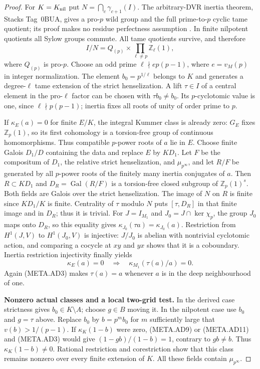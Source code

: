 \begin{proof}
For $K=K_{\rm nil}$ put $N=\bigcap_c\gamma_{c+1}(I)$.
The arbitrary-DVR inertia theorem, Stacks Tag~0BUA,
gives a pro-$p$ wild group and the full prime-to-$p$
cyclic tame quotient; its proof makes no residue
perfectness assumption \citep{AN_Stacks0BUA}.
In finite nilpotent quotients all Sylow groups commute.
All tame quotients survive, and therefore
\[
              I/N=Q_{(p)}\times
                         \prod_{\ell\ne p}\mathbb Z_\ell(1),
                                                               \tag{META.AD10}
\]
where $Q_{(p)}$ is pro-$p$.
Choose an odd prime $\ell\nmid e p(p-1)$, where
$e=v_M(p)$ in integer normalization.
The element $b_0=p^{1/\ell}$ belongs to $K$ and
generates a degree-$\ell$ tame extension of the
strict henselization.  A lift $\tau\in I$ of a
central element in the pro-$\ell$ factor can be
chosen with $\tau b_0\ne b_0$.
Its $p$-cyclotomic value is one, since $\ell\nmid p(p-1)$;
inertia fixes all roots of unity of order prime to $p$.

If $\kappa_E(a)=0$ for finite $E/K$, the integral
Kummer class is already zero: $G_E$ fixes $\mathbb Z_p(1)$,
so its first cohomology is a torsion-free group of
continuous homomorphisms.  Thus compatible $p$-power
roots of $a$ lie in $E$.
Choose finite Galois $D_1/D$ containing the data and
replace $E$ by $KD_1$.
Let $F$ be the compositum of $D_1$, the relative
strict henselization, and $\mu_{p^\infty}$, and let
$R/F$ be generated by all $p$-power roots of the
finitely many inertia conjugates of $a$.
Then $R\subset KD_1$ and
$D_R=\operatorname{Gal}(R/F)$ is a torsion-free
closed subgroup of $\mathbb Z_p(1)^s$.
Both fields are Galois over the strict henselization.
The image of $N$ on $R$ is finite since $KD_1/K$ is
finite.  Centrality of $\tau$ modulo $N$ puts
$[\tau,D_R]$ in that finite image and in $D_R$;
thus it is trivial.
For $J=I_{M_1}$ and $J_0=J\cap\ker\chi_p$, the group
$J_0$ maps onto $D_R$, so this equality gives
$\kappa_{J_0}(\tau a)=\kappa_{J_0}(a)$.
Restriction from $H^1(J,V)$ to $H^1(J_0,V)$ is
injective: $J/J_0$ is abelian with nontrivial
cyclotomic action, and comparing a cocycle at $xy$
and $yx$ shows that it is a coboundary.
Inertia restriction injectivity finally yields
\[
 \kappa_E(a)=0\quad\Longrightarrow\quad
                         \kappa_{M_1}(\tau(a)/a)=0.            \tag{META.AD11}
\]
Again (META.AD3) makes $\tau(a)=a$ whenever $a$ is
in the deep neighbourhood of one.

\medskip\noindent\textbf{Nonzero actual classes and a local two-grid test.}
In the derived case strictness gives $b_0\in K\setminus A$;
choose $g\in B$ moving it.
In the nilpotent case use $b_0$ and $g=\tau$ above.
Replace $b_0$ by $b=p^m b_0$ for $m$ sufficiently large
that $v(b)>1/(p-1)$.
If $\kappa_K(1-b)$ were zero, (META.AD9) or (META.AD11)
and (META.AD3) would give
$(1-gb)/(1-b)=1$, contrary to $gb\ne b$.
Thus $\kappa_K(1-b)\ne0$.
Rational restriction and corestriction show that this
class remains nonzero over every finite extension of $K$.
All these fields contain $\mu_{p^\infty}$.


\end{proof}
